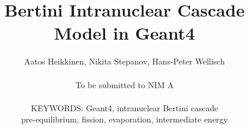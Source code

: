 \def \PIC {pictures}

\title{Bertini Intranuclear Cascade Model in {\sc Geant4} }

\author{Aatos Heikkinen, 
Nikita Stepanov, 
Hans-Peter Wellisch \\~ \\
{\small To be submitted to NIM A} \\~ \\
{\small KEYWORDS: Geant4, intranuclear Bertini cascade } \\
{\small pre-equilibrium, fission, evaporation, intermediate energy}}


\maketitle

\newpage
\tableofcontents
\newpage

  

 
 
%




\begin{appendix} 
%
\end{appendix} 





